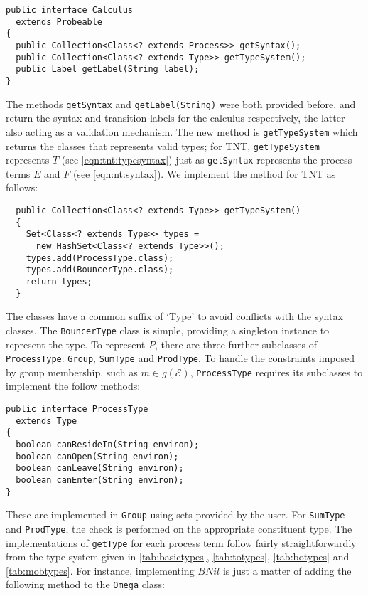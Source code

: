 \begin{verbatim}
public interface Calculus
  extends Probeable
{
  public Collection<Class<? extends Process>> getSyntax();
  public Collection<Class<? extends Type>> getTypeSystem();
  public Label getLabel(String label);
}
\end{verbatim}

The methods \texttt{getSyntax} and \texttt{getLabel(String)} were both
provided before, and return the syntax and transition labels for the
calculus respectively, the latter also acting as a validation
mechanism.  The new method is \texttt{getTypeSystem} which returns the
classes that represents valid types; for TNT, \texttt{getTypeSystem}
represents $T$ (see \ref{eqn:tnt:typesyntax}) just as
\texttt{getSyntax} represents the process terms $E$ and $F$ (see
\ref{eqn:nt:syntax}).  We implement the method for TNT as follows:

\begin{verbatim}
  public Collection<Class<? extends Type>> getTypeSystem()
  {
    Set<Class<? extends Type>> types =
      new HashSet<Class<? extends Type>>();
    types.add(ProcessType.class);
    types.add(BouncerType.class);
    return types;
  }
\end{verbatim}

The classes have a common suffix of `Type' to avoid conflicts with the
syntax classes.  The \texttt{BouncerType} class is simple, providing a
singleton instance to represent the type.  To represent $P$, there are
three further subclasses of \texttt{ProcessType}: \texttt{Group},
\texttt{SumType} and \texttt{ProdType}.  To handle the constraints
imposed by group membership, such as $m \in g(\mathscr{E})$,
\texttt{ProcessType} requires its subclasses to implement the follow
methods:

\begin{verbatim}
public interface ProcessType
  extends Type
{
  boolean canResideIn(String environ);
  boolean canOpen(String environ);
  boolean canLeave(String environ);
  boolean canEnter(String environ);
}
\end{verbatim}

These are implemented in \texttt{Group} using sets provided by the
user.  For \texttt{SumType} and \texttt{ProdType}, the check is
performed on the appropriate constituent type.  The implementations of
\texttt{getType} for each process term follow fairly straightforwardly
from the type system given in \ref{tab:basictypes}, \ref{tab:totypes},
\ref{tab:botypes} and \ref{tab:mobtypes}.  For instance, implementing
$BNil$ is just a matter of adding the following method to the
\texttt{Omega} class:

